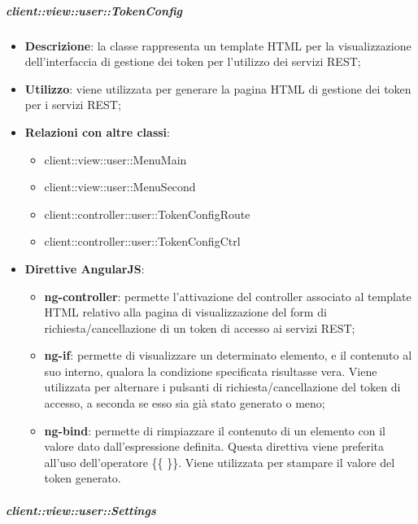 		\subparagraph{client::view::user::TokenConfig} %
		\label{subp:bdsm_app_client_view_user_tokenconfig}

			\begin{itemize}
				\item \textbf{Descrizione}: la classe rappresenta un template HTML per la visualizzazione dell'interfaccia di gestione dei token per l'utilizzo dei servizi REST;
				\item \textbf{Utilizzo}: viene utilizzata per generare la pagina HTML di gestione dei token per i servizi REST;
				\item \textbf{Relazioni con altre classi}:
					\begin{itemize}
						\item client::view::user::MenuMain
						\item client::view::user::MenuSecond
						\item client::controller::user::TokenConfigRoute
						\item client::controller::user::TokenConfigCtrl
					\end{itemize}
				\item \textbf{Direttive AngularJS}:
					\begin{itemize}
						\item \textbf{ng-controller}: permette l'attivazione del controller associato al template HTML relativo alla pagina di visualizzazione del form di richiesta/cancellazione di un token di accesso ai servizi REST;
						\item \textbf{ng-if}: permette di visualizzare un determinato elemento, e il contenuto al suo interno, qualora la condizione specificata risultasse vera. Viene utilizzata per alternare i pulsanti di richiesta/cancellazione del token di accesso, a seconda se esso sia già stato generato o meno;
						\item \textbf{ng-bind}: permette di rimpiazzare il contenuto di un elemento con il valore dato dall'espressione definita. Questa direttiva viene preferita all'uso dell'operatore \{\{ \}\}. Viene utilizzata per stampare il valore del token generato.
					\end{itemize}
			\end{itemize}

		\subparagraph{client::view::user::Settings} %
		\label{subp:bdsm_app_client_view_user_settings}

